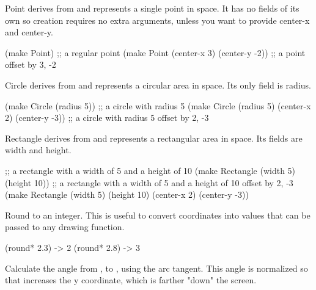 Point derives from  and represents a single point in space. It has no fields of its own so creation requires no extra arguments, unless you want to provide center-x and center-y.

\begin{schemedisplay}
(make Point) ;; a regular point
(make Point (center-x 3) (center-y -2)) ;; a point offset by 3, -2
\end{schemedisplay}


Circle derives from  and represents a circular area in space. Its only field is radius.

\begin{schemedisplay}
(make Circle (radius 5)) ;; a circle with radius 5
(make Circle (radius 5) (center-x 2) (center-y -3)) ;; a circle with radius 5 offset by 2, -3
\end{schemedisplay}


Rectangle derives from  and represents a rectangular area in space. Its fields are width and height.

\begin{schemedisplay}
;; a rectangle with a width of 5 and a height of 10
(make Rectangle (width 5) (height 10))
;; a rectangle with a width of 5 and a height of 10 offset by 2, -3
(make Rectangle (width 5) (height 10) (center-x 2) (center-y -3))
\end{schemedisplay}


Round  to an integer. This is useful to convert coordinates into values that can be passed to any drawing function.

\begin{schemedisplay}
(round* 2.3) -> 2
(round* 2.8) -> 3
\end{schemedisplay}


Calculate the angle from , to , using the arc tangent. This angle is normalized so that  increases the y coordinate, which is farther "down" the screen.


\newline
{}

